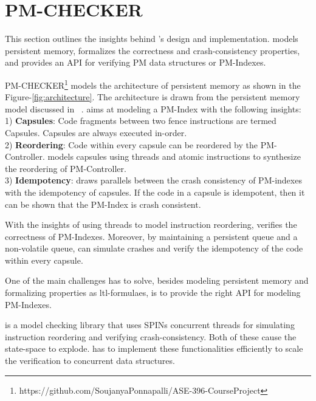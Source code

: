\section{PM-CHECKER}

This section outlines the insights behind \checker's design and implementation.
\Checker models persistent memory, formalizes the correctness and
crash-consistency properties, and provides an API for verifying PM data
structures or PM-Indexes.



PM-CHECKER\footnote{https://github.com/SoujanyaPonnapalli/ASE-396-CourseProject}
models the architecture of persistent memory as shown in the
Figure-\ref{fig:architecture}. The architecture is drawn from the persistent
memory model discussed in ~\cite{blelloch2018parallel}. \Checker aims at
modeling a PM-Index with the following insights:\\
1) \textbf{Capsules}: Code fragments between two fence instructions are termed
Capsules. Capsules are always executed in-order.\\
2) \textbf{Reordering}: Code within every capsule can be reordered by the
PM-Controller. \Checker models capsules using threads and atomic instructions to
synthesize the reordering of PM-Controller.\\
3) \textbf{Idempotency}: \Checker draws parallels between the crash
consistency of PM-indexes with the idempotency of capsules. If the code in a
capsule is idempotent, then it can be shown that the PM-Index is crash
consistent.

With the insights of using threads to model instruction reordering, \checker
verifies the correctness of PM-Indexes. Moreover, by maintaining a persistent
queue and a non-volatile queue, \checker can simulate crashes and verify the
idempotency of the code within every capsule.

One of the main challenges \checker has to solve, besides modeling persistent
memory and formalizing properties as ltl-formulaes, is to provide the right API
for modeling PM-Indexes.

\Checker is a model checking library that uses SPINs concurrent threads for
simulating instruction reordering and verifying crash-consistency. Both of these
cause the state-space to explode. \Checker has to implement these
functionalities efficiently to scale the verification to concurrent data
structures.

